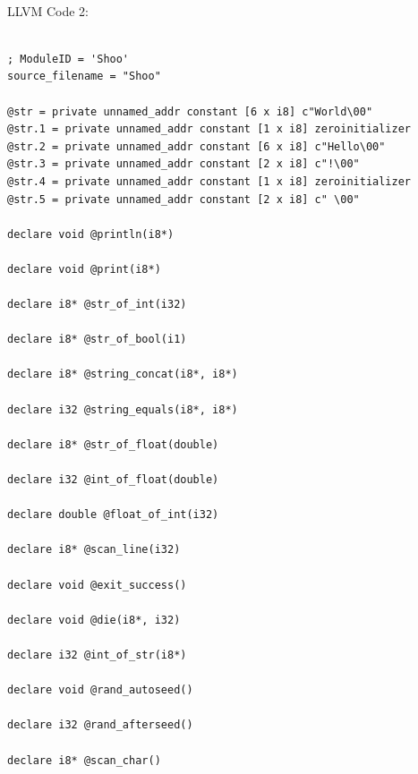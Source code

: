 \documentclass[12pt]{article}
\begin{document}
\\
LLVM Code 2:\\
\\
\begin{mdframed}[hidealllines=true,backgroundcolor=green!10]
\begin{lstlisting}
; ModuleID = 'Shoo'
source_filename = "Shoo"

@str = private unnamed_addr constant [6 x i8] c"World\00"
@str.1 = private unnamed_addr constant [1 x i8] zeroinitializer
@str.2 = private unnamed_addr constant [6 x i8] c"Hello\00"
@str.3 = private unnamed_addr constant [2 x i8] c"!\00"
@str.4 = private unnamed_addr constant [1 x i8] zeroinitializer
@str.5 = private unnamed_addr constant [2 x i8] c" \00"

declare void @println(i8*)

declare void @print(i8*)

declare i8* @str_of_int(i32)

declare i8* @str_of_bool(i1)

declare i8* @string_concat(i8*, i8*)

declare i32 @string_equals(i8*, i8*)

declare i8* @str_of_float(double)

declare i32 @int_of_float(double)

declare double @float_of_int(i32)

declare i8* @scan_line(i32)

declare void @exit_success()

declare void @die(i8*, i32)

declare i32 @int_of_str(i8*)

declare void @rand_autoseed()

declare i32 @rand_afterseed()

declare i8* @scan_char()


\end{lstlisting}
\end{mdframed}
\end{document}
